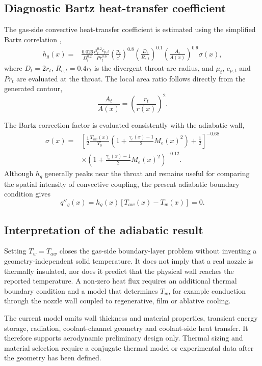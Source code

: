 \subsection{Diagnostic Bartz heat-transfer coefficient}

The gas-side convective heat-transfer coefficient is estimated using the simplified
Bartz correlation \cite{Bartz},
\begin{equation}
\begin{split}
h_g(x)={}&
\frac{0.026}{D_t^{0.2}}
\frac{\mu_t^{0.2}c_{p,t}}{Pr_t^{0.6}}
\left(\frac{p_c}{c^*}\right)^{0.8}
\left(\frac{D_t}{R_{c,t}}\right)^{0.1}
\left(\frac{A_t}{A(x)}\right)^{0.9}
\sigma(x),
\end{split}
\label{eq:bartz_hg}
\end{equation}
where \(D_t=2r_t\), \(R_{c,t}=0.4r_t\) is the divergent throat-arc
radius, and \(\mu_t\), \(c_{p,t}\) and \(Pr_t\) are evaluated at the
throat. The local area ratio follows directly from the generated contour,
\begin{equation}
\frac{A_t}{A(x)}=\left(\frac{r_t}{r(x)}\right)^2.
\end{equation}

The Bartz correction factor is evaluated consistently with the adiabatic wall,
\begin{equation}
\begin{split}
\sigma(x)={}&
\left[
\frac{1}{2}
\frac{T_{aw}(x)}{T_0}
\left(1+\frac{\gamma_e(x)-1}{2}M_e(x)^2\right)
+\frac{1}{2}
\right]^{-0.68}
\\
&\times
\left(1+\frac{\gamma_e(x)-1}{2}M_e(x)^2\right)^{-0.12}.
\end{split}
\label{eq:bartz_sigma}
\end{equation}
Although \(h_g\) generally peaks near the throat and remains useful for comparing
the spatial intensity of convective coupling, the present adiabatic boundary
condition gives
\begin{equation}
q''_g(x)=h_g(x)\left[T_{aw}(x)-T_w(x)\right]=0.
\label{eq:convective_heat_flux}
\end{equation}

\subsection{Interpretation of the adiabatic result}

Setting \(T_w=T_{aw}\) closes the gas-side boundary-layer problem without inventing
a geometry-independent solid temperature. It does not imply that a real nozzle is
thermally insulated, nor does it predict that the physical wall reaches the reported
temperature. A non-zero heat flux requires an additional thermal boundary condition
and a model that determines \(T_w\), for example conduction through the nozzle wall
coupled to regenerative, film or ablative cooling.

The current model omits wall thickness and material properties, transient energy
storage, radiation, coolant-channel geometry and coolant-side heat transfer. It
therefore supports aerodynamic preliminary design only. Thermal sizing and material
selection require a conjugate thermal model or experimental data after the geometry
has been defined.
